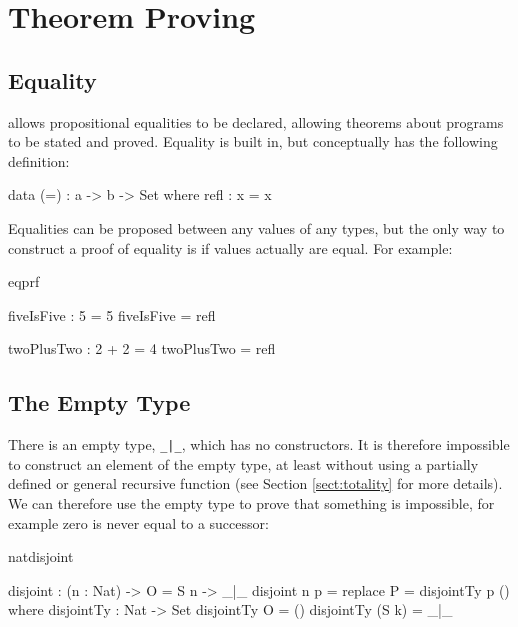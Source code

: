 \section{Theorem Proving}

\subsection{Equality}

\Idris{} allows propositional equalities to be declared, allowing theorems about
programs to be stated and proved. Equality is built in, but conceptually has
the following definition:

\begin{SaveVerbatim}{}

data (=) : a -> b -> Set where
   refl : x = x

\end{SaveVerbatim}
\useverb{}

\noindent
Equalities can be proposed between any values of any types, but the only way to
construct a proof of equality is if values actually are equal. For example:

\begin{SaveVerbatim}{eqprf}

fiveIsFive : 5 = 5
fiveIsFive = refl

twoPlusTwo : 2 + 2 = 4
twoPlusTwo = refl

\end{SaveVerbatim}

\subsection{The Empty Type}

\label{sect:empty}

There is an empty type, \texttt{\_|\_}, which has no constructors. It is
therefore impossible to construct an element of the empty type, at least
without using a partially defined or general recursive function (see Section
\ref{sect:totality} for more details). We can therefore use the empty type
to prove that something is impossible, for example zero is never equal
to a successor:

\begin{SaveVerbatim}{natdisjoint}

disjoint : (n : Nat) -> O = S n -> _|_
disjoint n p = replace {P = disjointTy} p ()
  where
    disjointTy : Nat -> Set
    disjointTy O = ()
    disjointTy (S k) = _|_

\end{SaveVerbatim}

